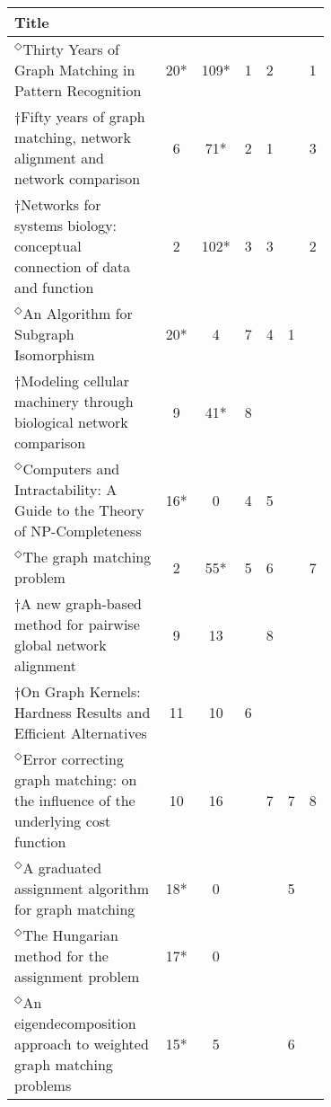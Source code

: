 \documentclass[12pt]{thesis}
\theoremstyle{plain}
\theoremstyle{definition}
\theoremstyle{remark}
\begin{document}
 
\begin{table}[H]
\centering
\vspace{-.5cm}
{\fontsize{10}{13}\selectfont
\begin{tabular}{|L{0.7\linewidth}|c|c|c|c|c|c|}
\hline
Title &  &   &  &   &   &  \\ 
\hline\hline
$^\Diamond$Thirty Years of Graph Matching in Pattern Recognition  \cite{Conte_2004} & 20* & 109* & 1 & 2 &  & 1 \\ \hline
$\dagger$Fifty years of graph matching, network alignment and network comparison  \cite{Emmert_Streib_2016} & 6 & 71* & 2 & 1 &  & 3 \\ \hline
$\dagger$Networks for systems biology: conceptual connection of data and function  \cite{Emmert_Streib_2011} & 2 & 102* & 3 & 3 &  & 2 \\ \hline
$^\Diamond$An Algorithm for Subgraph Isomorphism  \cite{Ullmann_1976} & 20* & 4 & 7 & 4 & 1 &  \\ \hline
$\dagger$Modeling cellular machinery through biological network comparison  \cite{Sharan_2006} & 9 & 41* & 8 &  &  &  \\ \hline
$^\Diamond$Computers and Intractability: A Guide to the Theory of NP-Completeness  \cite{Hartmanis_1982} & 16* & 0 & 4 & 5 &  &  \\ \hline
$^\Diamond$The graph matching problem  \cite{Livi_2012} & 2 & 55* & 5 & 6 &  & 7 \\ \hline
$\dagger$A new graph-based method for pairwise global network alignment  \cite{Klau_2009} & 9 & 13 &  & 8 &  &  \\ \hline
$\dagger$On Graph Kernels: Hardness Results and Efficient Alternatives  \cite{Gartner_2003} & 11 & 10 & 6 &  &  &  \\ \hline
$^\Diamond$Error correcting graph matching: on the influence of the underlying cost function  \cite{Bunke_1999} & 10 & 16 &  & 7 & 7 & 8 \\ \hline
$^\Diamond$A graduated assignment algorithm for graph matching  \cite{Gold_1996} & 18* & 0 &  &  & 5 &  \\ \hline
$^\Diamond$The Hungarian method for the assignment problem  \cite{Kuhn_1955} & 17* & 0 &  &  &  &  \\ \hline
$^\Diamond$An eigendecomposition approach to weighted graph matching problems  \cite{Umeyama_1988} & 15* & 5 &  &  & 6 &  \\ \hline

\end{tabular}}
\end{table}
\end{document}
